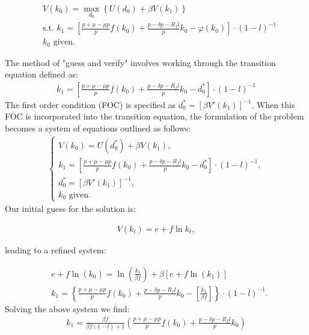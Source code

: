 \documentclass[12pt]{report}
\begin{document}
 \begin{align}
     & V(k_0) = \max_{d_0} \left\{U(d_0) + \beta V(k_1)\right\} \\
     & \text{s.t. } k_1 = \left[ \frac{p + \mu - \mu p}{p}f(k_{0}) + \frac{p - \delta p - R_f l}{p} k_{0}  - \varphi(k_{0}) \right] \cdot \left(1-l\right)^{-1} \nonumber  \\
     & k_0 \text{ given.} \nonumber
 \end{align}

 The method of "guess and verify" involves working through the
 transition equation defined as:
 \begin{align*}
     k_1 = \left[ \frac{p + \mu - \mu p}{p}f(k_{0}) + \frac{p - \delta p - R_f l}{p} k_{0}  - d^*_0 \right] \cdot \left(1-l\right)^{-1}
 \end{align*}
The first order condition (FOC) is specified as \(d^*_0 = [\beta V'(k_{1})]^{-1}\). When this
 FOC is incorporated into the transition equation, the formulation of the problem becomes a system of equations outlined
 as follows:
 \begin{align*}
     \begin{cases}
         V(k_0) = U(d_0^*) + \beta V(k_1), \\
         k_1 = \left[ \frac{p + \mu - \mu p}{p}f(k_{0}) + \frac{p - \delta p - R_f l}{p} k_{0}  - d^*_0 \right] \cdot \left(1-l\right)^{-1}, \\
         d^*_0 = [\beta V'(k_{1})]^{-1},\\
         k_0 \text{ given.}
     \end{cases}
 \end{align*}
Our initial guess for the solution is:

 \begin{align*}
     V(k_t) = e + f \ln{k_t},
 \end{align*}

leading to a refined system:


 \begin{align}
    &e + f \ln(k_0) = \ln\left( \frac{k_1}{\beta f} \right) + \beta \left[ e + f \ln(k_1) \right] \label{eq28}\\
    &k_1 = \left\{ \frac{p + \mu - \mu p}{p}f(k_{0}) + \frac{p - \delta p - R_f l}{p} k_{0} - \left[ \frac{k_1}{\beta f} \right] \right\} \cdot \left(1-l\right)^{-1}. \nonumber
\end{align}
Solving the above system we find:
\begin{align}
    k_1 = \frac{\beta f}{\beta f (1-l) + 1} \left( \frac{p + \mu - \mu p}{p}f(k_{0}) + \frac{p - \delta p - R_f l}{p} k_{0} \right)
\end{align}
\end{document}
